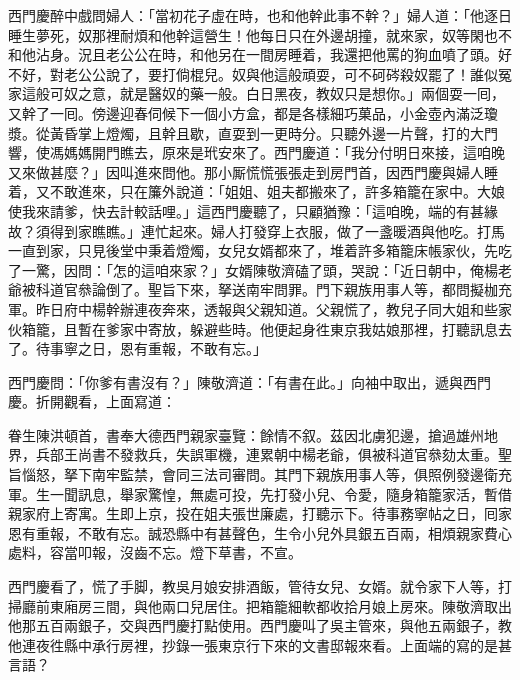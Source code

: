 西門慶醉中戲問婦人：「當初花子虛在時，也和他幹此事不幹？」婦人道：「他逐日睡生夢死，奴那裡耐煩和他幹這營生！他每日只在外邊胡撞，就來家，奴等閑也不和他沾身。況且老公公在時，和他另在一間房睡着，我還把他罵的狗血噴了頭。好不好，對老公公說了，{}要打倘棍兒。奴與他這般頑耍，可不砢硶殺奴罷了！誰似冤家這般可奴之意，就是醫奴的藥一般。白日黑夜，教奴只是想你。」兩個耍一囘，又幹了一囘。傍邊迎春伺候下一個小方盒，都是各樣細巧菓品，小金壺內滿泛瓊漿。從黃昏掌上燈燭，且幹且歇，直耍到一更時分。只聽外邊一片聲，打的大門響，使馮媽媽開門瞧去，原來是玳安來了。西門慶道：「我分付明日來接，這咱晚又來做甚麼？」因叫進來問他。那小厮慌慌張張走到房門首，因西門慶與婦人睡着，又不敢進來，只在簾外說道：「姐姐、姐夫都搬來了，許多箱籠在家中。大娘使我來請爹，快去計較話哩。」這西門慶聽了，只顧猶豫：「這咱晚，端的有甚緣故？須得到家瞧瞧。」連忙起來。婦人打發穿上衣服，做了一盞暖酒與他吃。打馬一直到家，只見後堂中秉着燈燭，女兒女婿都來了，堆着許多箱籠床帳家伙，先吃了一驚，因問：「怎的這咱來家？」女婿陳敬濟磕了頭，哭說：「近日朝中，俺楊老爺被科道官叅論倒了。聖旨下來，拏送南牢問罪。門下親族用事人等，都問擬枷充軍。昨日府中楊幹辦連夜奔來，透報與父親知道。父親慌了，教兒子同大姐和些家伙箱籠，且暫在爹家中寄放，躲避些時。他便起身徃東京我姑娘那裡，打聽訊息去了。待事寧之日，恩有重報，不敢有忘。」

西門慶問：「你爹有書沒有？」陳敬濟道：「有書在此。」向袖中取出，遞與西門慶。折開觀看，上面寫道：

\begin{myquote}[\markfont]
眷生陳洪頓首，書奉大德西門親家臺覽：餘情不叙。茲因北虜犯邊，搶過雄州地界，兵部王尚書不發救兵，失誤軍機，連累朝中楊老爺，{}俱被科道官叅劾太重。聖旨惱怒，拏下南牢監禁，會同三法司審問。其門下親族用事人等，俱照例發邊衛充軍。生一聞訊息，舉家驚惶，無處可投，先打發小兒、令愛，隨身箱籠家活，暫借親家府上寄寓。生即上京，投在姐夫張世廉處，打聽示下。待事務寧帖之日，囘家恩有重報，不敢有忘。誠恐縣中有甚聲色，{}生令小兒外具銀五百兩，相煩親家費心處料，容當叩報，沒齒不忘。燈下草書，不宣。

\end{myquote}

西門慶看了，慌了手脚，教吳月娘安排酒飯，管待女兒、女婿。就令家下人等，打掃廳前東廂房三間，與他兩口兒居住。把箱籠細軟都收拾月娘上房來。{}陳敬濟取出他那五百兩銀子，交與西門慶打點使用。西門慶叫了吳主管來，與他五兩銀子，教他連夜徃縣中承行房裡，抄錄一張東京行下來的文書邸報來看。上面端的寫的是甚言語？

